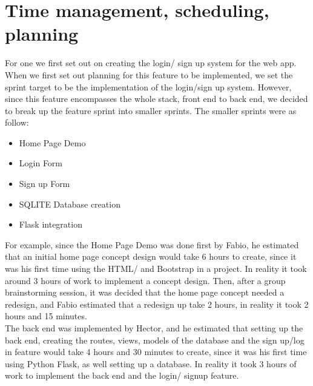 \section{Time management, scheduling, planning}
For one we first set out on creating the login/ sign up system for the web app. When we first set out planning for this feature to be implemented, we set the sprint target to be the implementation of the login/sign up system. However, since this feature encompasses the whole stack, front end to back end, we decided to break up the feature sprint into smaller sprints. The smaller sprints were as follow:
\begin{itemize}
  \item Home Page Demo
  \item Login Form
  \item Sign up Form
  \item SQLITE Database creation
  \item Flask integration
\end{itemize}
For example, since the Home Page Demo was done first by Fabio, he estimated that an initial home page concept design would take 6 hours to create, since it was his first time using the HTML/ and Bootstrap in a project. In reality it took around 3 hours of work to implement a concept design. Then, after a group brainstorming session, it was decided that the home page concept needed a redesign, and Fabio estimated that a redesign up take 2 hours, in reality it took 2 hours and 15 minutes.
\\The back end was implemented by Hector, and he estimated that setting up the back end, creating the routes, views, models of the database and the sign up/log in feature would take 4 hours and 30 minutes to create, since it was his first time using Python Flask, as well setting up a database. In reality it took 3 hours of work to implement the back end and the login/ signup feature.
